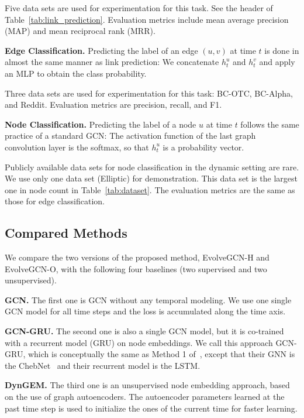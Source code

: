 \documentclass[letterpaper]{article} %
\begin{document}
Five data sets are used for experimentation for this task. See the header of Table~\ref{tab:link_prediction}. Evaluation metrics include mean average precision (MAP) and mean reciprocal rank (MRR).

\vskip5pt \noindent
\textbf{Edge Classification.}
Predicting the label of an edge $(u,v)$ at time $t$ is done in almost the same manner as link prediction: We concatenate $h_t^u$ and $h_t^v$ and apply an MLP to obtain the class probability. 

Three data sets are used for experimentation for this task: BC-OTC, BC-Alpha, and Reddit. Evaluation metrics are precision, recall, and F1.

\vskip5pt \noindent
\textbf{Node Classification.}
Predicting the label of a node $u$ at time $t$ follows the same practice of a standard GCN: The activation function of the last graph convolution layer is the softmax, so that $h_t^u$ is a probability vector.

Publicly available data sets for node classification in the dynamic setting are rare. We use only one data set (Elliptic) for demonstration. This data set is the largest one in node count in Table~\ref{tab:dataset}. The evaluation metrics are the same as those for edge classification.


\subsection{Compared Methods}
We compare the two versions of the proposed method, EvolveGCN-H and EvolveGCN-O, with the following four baselines (two supervised and two unsupervised).

\vskip5pt \noindent
\textbf{GCN.} The first one is GCN without any temporal modeling. We use one single GCN model for all time steps and the loss is accumulated along the time axis.

\vskip5pt \noindent
\textbf{GCN-GRU.} The second one is also a single GCN model, but it is co-trained with a recurrent model (GRU) on node embeddings. We call this approach GCN-GRU, which is conceptually the same as Method 1 of~\cite{Seo2016}, except that their GNN is the ChebNet~\cite{Defferrard2016} and their recurrent model is the LSTM.

\vskip5pt \noindent
\textbf{DynGEM.} \cite{Goyal2017} The third one is an unsupervised node embedding approach, based on the use of graph autoencoders. The autoencoder parameters learned at the past time step is used to initialize the ones of the current time for faster learning.
\end{document}
